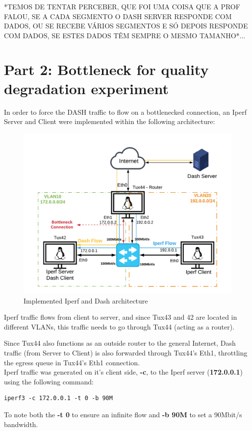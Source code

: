 \documentclass{article}
\begin{document}
*TEMOS DE TENTAR PERCEBER, QUE FOI UMA COISA QUE A PROF FALOU, SE A CADA SEGMENTO O DASH SERVER RESPONDE COM DADOS, OU SE RECEBE VÁRIOS SEGMENTOS E SÓ DEPOIS RESPONDE COM DADOS, SE ESTES DADOS TÊM SEMPRE O MESMO TAMANHO*...

\newpage
\section*{Part 2: Bottleneck for quality degradation experiment} 

In order to force the DASH traffic to flow on a bottlenecked connection, an 
Iperf Server and Client were implemented within the following architecture:

\begin{figure}[h!]
    \centering
    \includegraphics[width=0.9\linewidth,keepaspectratio]{NetworkArchi}
    \caption{Implemented Iperf and Dash architecture}
    \label{fig:Archi}
\end{figure}
\FloatBarrier

Iperf traffic flows from client to server, and since Tux43 and 42 are located in
different VLANs, this traffic needs to go through Tux44 (acting as a router).

Since Tux44 also functions as an outside router to the general Internet, Dash 
traffic (from Server to Client) is also forwarded through Tux44's Eth1, 
throttling the egress queue in Tux44's Eth1 connection.\\

Iperf traffic was generated on it's client side, \textbf{-c}, to the Iperf 
server (\textbf{172.0.0.1}) using the following command:
\begin{verbatim}
iperf3 -c 172.0.0.1 -t 0 -b 90M
\end{verbatim}
To note both the \textbf{-t 0} to ensure an infinite flow and \textbf{-b 90M} to
set a 90Mbit/s bandwidth.
\end{document}
